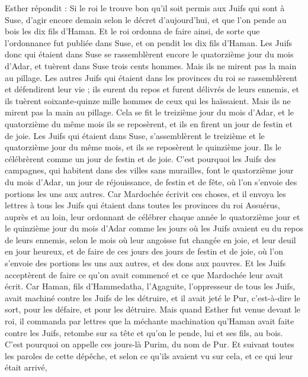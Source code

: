 \begin{multicols}{2}
Esther répondit : Si le roi le trouve bon qu'il soit permis aux Juifs qui sont à Suse, d'agir encore demain selon le décret d'aujourd'hui, et que l'on pende au bois les dix fils d'Haman.
Et le roi ordonna de faire ainsi, de sorte que l'ordonnance fut publiée dans Suse, et on pendit les dix fils d'Haman.
Les Juifs donc qui étaient dans Suse se rassemblèrent encore le quatorzième jour du mois d'Adar, et tuèrent dans Suse trois cents hommes. Mais ils ne mirent pas la main au pillage.
Les autres Juifs qui étaient dans les provinces du roi se rassemblèrent et défendirent leur vie ; ils eurent du repos et furent délivrés de leurs ennemis, et ils tuèrent soixante-quinze mille hommes de ceux qui les haïssaient. Mais ils ne mirent pas la main au pillage.
Cela se fit le treizième jour du mois d'Adar, et le quatorzième du même mois ils se reposèrent, et ils en firent un jour de festin et de joie.
Les Juifs qui étaient dans Suse, s'assemblèrent le treizième et le quatorzième jour du même mois, et ils se reposèrent le quinzième jour. Ils le célébrèrent comme un jour de festin et de joie.
C'est pourquoi les Juifs des campagnes, qui habitent dans des villes sans murailles, font le quatorzième jour du mois d'Adar, un jour de réjouissance, de festin et de fête, où l'on s'envoie des portions les uns aux autres.
Car Mardochée écrivit ces choses, et il envoya les lettres à tous les Juifs qui étaient dans toutes les provinces du roi Assuérus, auprès et au loin,
leur ordonnant de célébrer chaque année le quatorzième jour et le quinzième jour du mois d'Adar
comme les jours où les Juifs avaient eu du repos de leurs ennemis, selon le mois où leur angoisse fut changée en joie, et leur deuil en jour heureux, et de faire de ces jours des jours de festin et de joie, où l'on s'envoie des portions les uns aux autres, et des dons aux pauvres.
Et les Juifs acceptèrent de faire ce qu'on avait commencé et ce que Mardochée leur avait écrit.
Car Haman, fils d'Hammedatha, l'Agaguite, l'oppresseur de tous les Juifs, avait machiné contre les Juifs de les détruire, et il avait jeté le Pur, c'est-à-dire le sort, pour les défaire, et pour les détruire.
Mais quand Esther fut venue devant le roi, il commanda par lettres que la méchante machination qu'Haman avait faite contre les Juifs, retombe sur sa tête et qu'on le pende, lui et ses fils, au bois.
C'est pourquoi on appelle ces jours-là Purim, du nom de Pur. Et suivant toutes les paroles de cette dépêche, et selon ce qu'ils avaient vu sur cela, et ce qui leur était arrivé,

\end{multicols}
